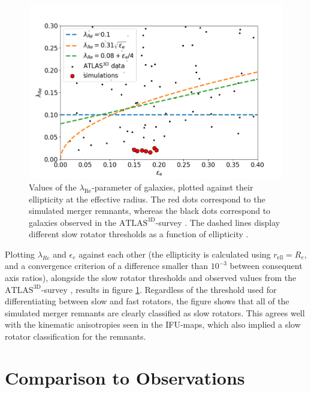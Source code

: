 \documentclass[english, twoside]{HYgradu}
\begin{document}
\begin{figure}
	\centering
	\includegraphics[width=\textwidth]{lambda_epsilon.png}
	\caption{Values of the $\lambda_{\mathrm{Re}}$-parameter of galaxies, plotted against their ellipticity at the effective radius. The red dots correspond to the simulated merger remnants, whereas the black dots correspond to galaxies observed in the $\mathrm{ATLAS^{3D}}$-survey \citep{Cappellari2011, Emsellem2011}. The dashed lines display different slow rotator thresholds as a function of ellipticity \citep{Emsellem2007, Emsellem2011, Cappellari2016}.}
	\label{figure:lambda_epsilon}
\end{figure}

Plotting $\lambda_{Re}$ and $\epsilon_e$ against each other (the ellipticity is calculated using $r_\mathrm{ell} = R_e$, and a convergence criterion of a difference smaller than $10^{-3}$ between consequent axis ratios), alongside the slow rotator thresholds and observed values from the $\mathrm{ATLAS^{3D}}$-survey \citep{Cappellari2011}, results in figure \ref{figure:lambda_epsilon}. Regardless of the threshold used for differentiating between slow and fast rotators, the figure shows that all of the simulated merger remnants are clearly classified as slow rotators. This agrees well with the kinematic anisotropies seen in the IFU-maps, which also implied a slow rotator classification for the remnants.

\section{Comparison to Observations}
\end{document}
